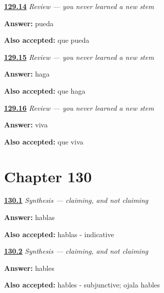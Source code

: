 \noindent\begin{minipage}[t]{\linewidth}
\raggedright
\hyperlink{review-ES-C18-repaso-el-yo-que-viaja-build}{\textbf{129.14}} \emph{Review — you never learned a new stem}\par
\small \textbf{Answer:} pueda\par
\footnotesize \textbf{Also accepted:} que pueda
\end{minipage}\par\medskip

\noindent\begin{minipage}[t]{\linewidth}
\raggedright
\hyperlink{review-ES-C18-repaso-el-yo-que-viaja-hago}{\textbf{129.15}} \emph{Review — you never learned a new stem}\par
\small \textbf{Answer:} haga\par
\footnotesize \textbf{Also accepted:} que haga
\end{minipage}\par\medskip

\noindent\begin{minipage}[t]{\linewidth}
\raggedright
\hyperlink{review-ES-C18-repaso-el-yo-que-viaja-vivo}{\textbf{129.16}} \emph{Review — you never learned a new stem}\par
\small \textbf{Answer:} viva\par
\footnotesize \textbf{Also accepted:} que viva
\end{minipage}\par\medskip

\section*{Chapter 130}

\noindent\begin{minipage}[t]{\linewidth}
\raggedright
\hyperlink{review-ES-C18-sintesis-subjuntivo-assert}{\textbf{130.1}} \emph{Synthesis — claiming, and not claiming}\par
\small \textbf{Answer:} hablas\par
\footnotesize \textbf{Also accepted:} hablas - indicative
\end{minipage}\par\medskip

\noindent\begin{minipage}[t]{\linewidth}
\raggedright
\hyperlink{review-ES-C18-sintesis-subjuntivo-wish}{\textbf{130.2}} \emph{Synthesis — claiming, and not claiming}\par
\small \textbf{Answer:} hables\par
\footnotesize \textbf{Also accepted:} hables - subjunctive; ojala hables
\end{minipage}\par\medskip

